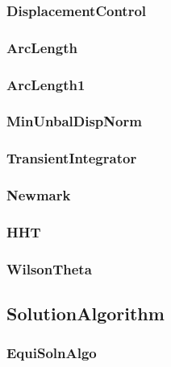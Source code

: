 \pagebreak \subsubsection{ DisplacementControl}


\pagebreak \subsubsection{ ArcLength}


\pagebreak \subsubsection{ ArcLength1}


\pagebreak \subsubsection{ MinUnbalDispNorm}


\pagebreak \subsubsection{{\bf TransientIntegrator}}


\pagebreak \subsubsection{Newmark}


\pagebreak \subsubsection{HHT}


\pagebreak \subsubsection{WilsonTheta}


\pagebreak \subsection{{\bf SolutionAlgorithm}}


\pagebreak \subsubsection{{\bf EquiSolnAlgo}}


